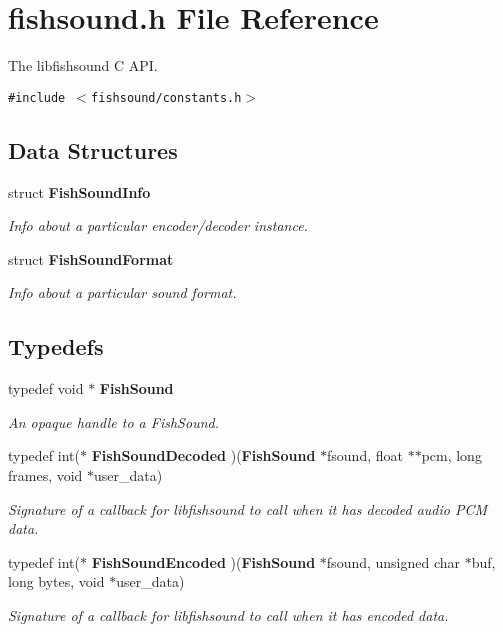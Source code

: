 \section{fishsound.h File Reference}
\label{fishsound_8h}
The libfishsound C API.  


{\tt \#include $<$fishsound/constants.h$>$}\par
\subsection*{Data Structures}
\begin{CompactItemize}
\item 
struct {\bf Fish\-Sound\-Info}
\begin{CompactList}\small\item\em Info about a particular encoder/decoder instance. \item\end{CompactList}\item 
struct {\bf Fish\-Sound\-Format}
\begin{CompactList}\small\item\em Info about a particular sound format. \item\end{CompactList}\end{CompactItemize}
\subsection*{Typedefs}
\begin{CompactItemize}
\item 
typedef void $\ast$ {\bf Fish\-Sound}
\begin{CompactList}\small\item\em An opaque handle to a Fish\-Sound. \item\end{CompactList}\item 
typedef int($\ast$ {\bf Fish\-Sound\-Decoded} )({\bf Fish\-Sound} $\ast$fsound, float $\ast$$\ast$pcm, long frames, void $\ast$user\_\-data)
\begin{CompactList}\small\item\em Signature of a callback for libfishsound to call when it has decoded audio PCM data. \item\end{CompactList}\item 
typedef int($\ast$ {\bf Fish\-Sound\-Encoded} )({\bf Fish\-Sound} $\ast$fsound, unsigned char $\ast$buf, long bytes, void $\ast$user\_\-data)
\begin{CompactList}\small\item\em Signature of a callback for libfishsound to call when it has encoded data. \item\end{CompactList}\end{CompactItemize}
